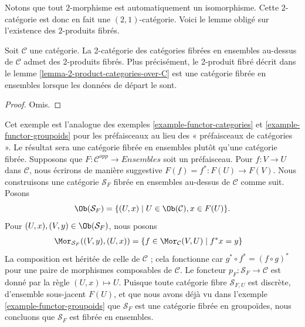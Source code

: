 \noindent
Notons que tout $2$-morphisme est automatiquement un isomorphisme.
Cette $2$-catégorie est donc en fait une $(2, 1)$-catégorie.
Voici le lemme obligé sur l'existence des $2$-produits fibrés.

\begin{lemma}
\label{lemma-2-product-categories-fibred-sets}
Soit $\mathcal{C}$ une catégorie.
La 2-catégorie des catégories fibrées en ensembles au-dessus de $\mathcal{C}$
admet des 2-produits fibrés. Plus précisément, le 2-produit fibré décrit dans le
lemme \ref{lemma-2-product-categories-over-C}
est une catégorie fibrée en ensembles lorsque les données de départ le sont.
\end{lemma}

\begin{proof}
Omis.
\end{proof}

\begin{example}
\label{example-presheaf}
Cet exemple est l'analogue des
exemples \ref{example-functor-categories} et
\ref{example-functor-groupoids}
pour les préfaisceaux au lieu des « préfaisceaux de catégories ».
Le résultat sera une catégorie fibrée en ensembles plutôt qu'une catégorie fibrée.
Supposons que $F : \mathcal{C}^{opp} \to \textit{Ensembles}$ soit un préfaisceau.
Pour $f : V \to U$ dans $\mathcal{C}$, nous écrirons de manière suggestive
$F(f) = f^\ast : F(U) \to F(V)$.
Nous construisons une catégorie $\mathcal{S}_F$ fibrée en ensembles au-dessus de
$\mathcal{C}$ comme suit. Posons
$$
\Ob(\mathcal{S}_F) =
\{(U, x) \mid U \in \Ob(\mathcal{C}), x \in F(U)\}.
$$
Pour $(U, x), (V, y) \in \Ob(\mathcal{S}_F)$, nous posons
\begin{align*}
\Mor_{\mathcal{S}_F}((V, y), (U, x))
& =
\{f \in \Mor_\mathcal{C}(V, U) \mid f^*x = y\}
\end{align*}
La composition est héritée de celle de $\mathcal{C}$ ; cela fonctionne car
$g^\ast \circ f^\ast = (f \circ g)^\ast$
pour une paire de morphismes composables de $\mathcal{C}$.
Le foncteur $p_F : \mathcal{S}_F \to \mathcal{C}$
est donné par la règle $(U, x) \mapsto U$.
Puisque toute catégorie fibre $\mathcal{S}_{F, U}$ est discrète, d'ensemble
sous-jacent $F(U)$, et que nous avons déjà vu dans
l'exemple \ref{example-functor-groupoids}
que $\mathcal{S}_F$ est une catégorie fibrée en groupoïdes,
nous concluons que $\mathcal{S}_F$ est fibrée en ensembles.
\end{example}

